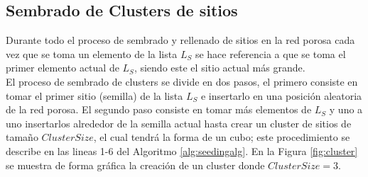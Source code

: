 

\subsection{Sembrado de Clusters de sitios}
\label{subsec:sseeding}
Durante todo el proceso de sembrado y rellenado de sitios en la red porosa cada vez que se toma un elemento de la lista $L_S$ 
se hace referencia a que se toma el primer elemento actual de $L_S$, siendo este el sitio actual más grande.\\
El proceso de sembrado de clusters se divide en dos pasos, el primero consiste en tomar el primer sitio (semilla) de la lista $L_S$ e 
insertarlo en una posición aleatoria de la red porosa. El segundo paso consiste en tomar más elementos de $L_S$ y uno a uno insertarlos 
alrededor de la semilla actual hasta crear un cluster de sitios de tamaño $ClusterSize$, el cual tendrá la forma de un cubo; este 
procedimiento se describe en las lineas 1-6 del Algoritmo \ref{alg:seedingalg}. En la Figura \ref{fig:cluster} se muestra de forma 
gráfica la creación de un cluster donde $ClusterSize=3$.\\

